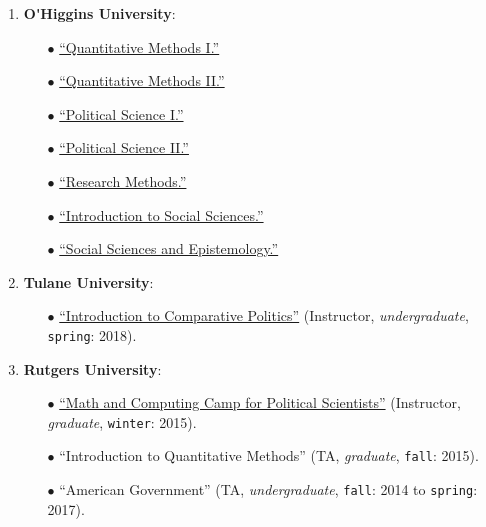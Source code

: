 \begin{enumerate}

\item {\bf O\'\unskip Higgins University}:
  
    \begin{itemize}
      \item[$\bullet$] \href{https://github.com/hbahamonde/OLS/raw/master/Bahamonde_OLS.pdf}{``Quantitative Methods I.''}
      \item[$\bullet$] \href{https://github.com/hbahamonde/MLE/raw/master/Bahamonde_MLE.pdf}{``Quantitative Methods II.''}
      \item[$\bullet$] \href{https://github.com/hbahamonde/Ciencia_Politica_I/raw/master/Bahamonde_Ciencia_Politica_I.pdf}{``Political Science I.''}
      \item[$\bullet$] \href{https://github.com/hbahamonde/Ciencia_Politica_II/raw/master/Bahamonde_Ciencia_Politica_II.pdf}{``Political Science II.''}
      \item[$\bullet$] \href{https://github.com/hbahamonde/Metodos_de_Investigacion/raw/master/Bahamonde_Metodos_de_Investigacion.pdf}{``Research Methods.''}
      \item[$\bullet$] \href{https://github.com/hbahamonde/Intro_Ciencias_Sociales/raw/master/Bahamonde_Intro_Ciencias_Sociales.pdf}{``Introduction to Social Sciences.''}
      \item[$\bullet$] \href{https://github.com/hbahamonde/Social_Sciences_Epistemology_UGRAD/raw/master/Bahamonde_Social_Sciences_Epistemology_UGRAD_Syllabus.pdf}{``Social Sciences and Epistemology.''}
    \end{itemize}

\item {\bf Tulane University}:
  
    \begin{itemize}
      \item[$\bullet$] \href{https://github.com/hbahamonde/Comparative_Politics_UGRAD/raw/master/Bahamonde_Comparative_Politics_Syllabus_UGRAD.pdf}{``Introduction to Comparative Politics''} (Instructor, \emph{undergraduate}, \texttt{spring}: 2018).
    \end{itemize}

\item {\bf Rutgers University}:

    \begin{itemize}
      \item[$\bullet$] \href{http://github.com/hbahamonde/Math-Camp/raw/master/Syllabus/Math_Camp_Syllabus.pdf/}{``Math and Computing Camp for Political Scientists''} (Instructor, \emph{graduate}, \texttt{winter}: 2015).
      
      \item[$\bullet$] ``Introduction to Quantitative Methods'' (TA, \emph{graduate}, \texttt{fall}: 2015).
      
      \item[$\bullet$] ``American Government'' (TA, \emph{undergraduate}, \texttt{fall}: 2014 to \texttt{spring}: 2017).
    \end{itemize}

\end{enumerate}